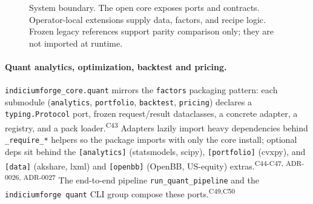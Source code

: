 \documentclass[11pt]{article}
\newcommand{\pkg}[1]{\texttt{#1}}
\newcommand{\claim}[1]{\textsuperscript{\textsf{#1}}}
\begin{document}
\begin{figure}[t]
\centering
{}
\caption{System boundary. The open core exposes ports and contracts. Operator-local
extensions supply data, factors, and recipe logic. Frozen legacy references support parity
comparison only; they are not imported at runtime.}
\label{fig:boundary}
\end{figure}

\paragraph{Quant analytics, optimization, backtest and pricing.}
\pkg{indiciumforge\_core.quant} mirrors the \pkg{factors} packaging pattern: each submodule
(\texttt{analytics}, \texttt{portfolio}, \texttt{backtest}, \texttt{pricing}) declares a
\verb|typing.Protocol| port, frozen request/result dataclasses, a concrete adapter, a
registry, and a pack loader.\claim{C43} Adapters lazily import heavy dependencies behind
\verb|_require_*| helpers so the package imports with only the core install; optional deps
sit behind the \texttt{[analytics]} (statsmodels, scipy), \texttt{[portfolio]} (cvxpy), and
\texttt{[data]} (akshare, lxml) and \texttt{[openbb]} (OpenBB, US-equity) extras.\claim{C44-C47, ADR-0026, ADR-0027} The end-to-end pipeline
\verb|run_quant_pipeline| and the \texttt{indiciumforge quant} CLI group compose these
ports.\claim{C49,C50}
\end{document}
